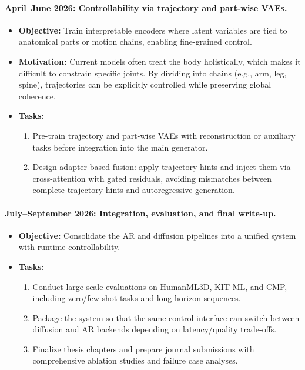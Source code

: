 \documentclass[a4paper,12pt]{article}
\begin{document}
\paragraph{April--June 2026: Controllability via trajectory and part-wise VAEs.}  
\begin{itemize}
    \item \textbf{Objective:} Train interpretable encoders where latent variables are tied to anatomical parts or motion chains, enabling fine-grained control.  
    \item \textbf{Motivation:} Current models often treat the body holistically, which makes it difficult to constrain specific joints. By dividing into chains (e.g., arm, leg, spine), trajectories can be explicitly controlled while preserving global coherence.  
    \item \textbf{Tasks:}
    \begin{enumerate}
        \item Pre-train trajectory and part-wise VAEs with reconstruction or auxiliary tasks before integration into the main generator.  
        \item Design adapter-based fusion: apply trajectory hints and inject them via cross-attention with gated residuals, avoiding mismatches between complete trajectory hints and autoregressive generation.  
    \end{enumerate}
\end{itemize}

\paragraph{July--September 2026: Integration, evaluation, and final write-up.}  
\begin{itemize}
    \item \textbf{Objective:} Consolidate the AR and diffusion pipelines into a unified system with runtime controllability.  
    \item \textbf{Tasks:}
    \begin{enumerate}
        \item Conduct large-scale evaluations on HumanML3D, KIT-ML, and CMP, including zero/few-shot tasks and long-horizon sequences.  
        \item Package the system so that the same control interface can switch between diffusion and AR backends depending on latency/quality trade-offs.  
        \item Finalize thesis chapters and prepare journal submissions with comprehensive ablation studies and failure case analyses.  
    \end{enumerate}
\end{itemize}
\end{document}
